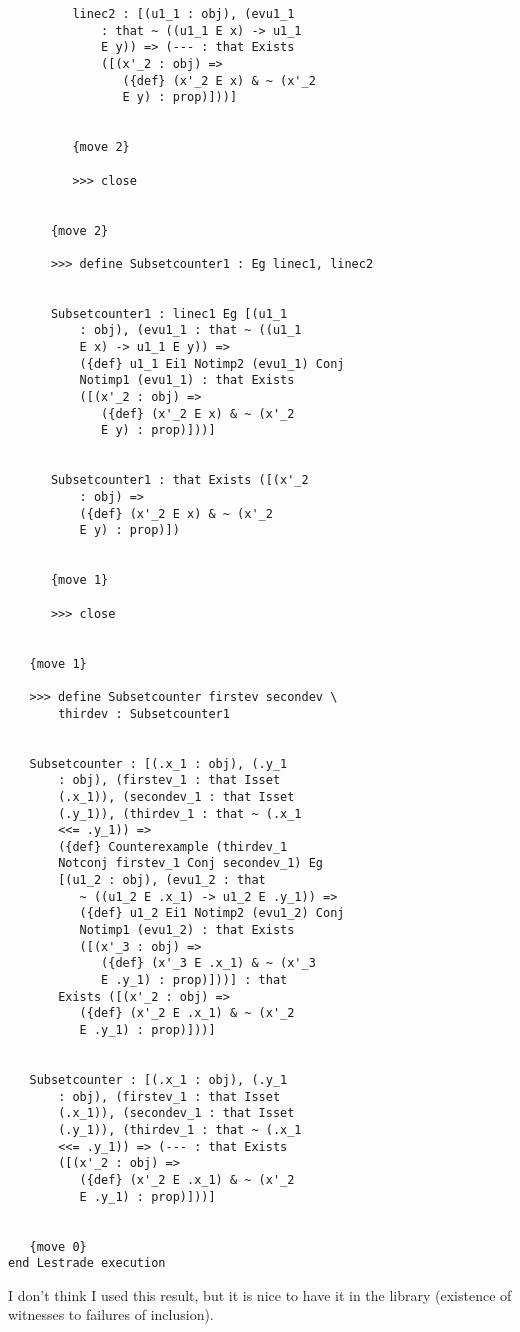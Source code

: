 \documentclass[12pt]{article}
\begin{document}
\begin{verbatim}
         linec2 : [(u1_1 : obj), (evu1_1 
             : that ~ ((u1_1 E x) -> u1_1 
             E y)) => (--- : that Exists 
             ([(x'_2 : obj) => 
                ({def} (x'_2 E x) & ~ (x'_2 
                E y) : prop)]))]


         {move 2}

         >>> close


      {move 2}

      >>> define Subsetcounter1 : Eg linec1, linec2


      Subsetcounter1 : linec1 Eg [(u1_1 
          : obj), (evu1_1 : that ~ ((u1_1 
          E x) -> u1_1 E y)) => 
          ({def} u1_1 Ei1 Notimp2 (evu1_1) Conj 
          Notimp1 (evu1_1) : that Exists 
          ([(x'_2 : obj) => 
             ({def} (x'_2 E x) & ~ (x'_2 
             E y) : prop)]))]


      Subsetcounter1 : that Exists ([(x'_2 
          : obj) => 
          ({def} (x'_2 E x) & ~ (x'_2 
          E y) : prop)])


      {move 1}

      >>> close


   {move 1}

   >>> define Subsetcounter firstev secondev \
       thirdev : Subsetcounter1


   Subsetcounter : [(.x_1 : obj), (.y_1 
       : obj), (firstev_1 : that Isset 
       (.x_1)), (secondev_1 : that Isset 
       (.y_1)), (thirdev_1 : that ~ (.x_1 
       <<= .y_1)) => 
       ({def} Counterexample (thirdev_1 
       Notconj firstev_1 Conj secondev_1) Eg 
       [(u1_2 : obj), (evu1_2 : that 
          ~ ((u1_2 E .x_1) -> u1_2 E .y_1)) => 
          ({def} u1_2 Ei1 Notimp2 (evu1_2) Conj 
          Notimp1 (evu1_2) : that Exists 
          ([(x'_3 : obj) => 
             ({def} (x'_3 E .x_1) & ~ (x'_3 
             E .y_1) : prop)]))] : that 
       Exists ([(x'_2 : obj) => 
          ({def} (x'_2 E .x_1) & ~ (x'_2 
          E .y_1) : prop)]))]


   Subsetcounter : [(.x_1 : obj), (.y_1 
       : obj), (firstev_1 : that Isset 
       (.x_1)), (secondev_1 : that Isset 
       (.y_1)), (thirdev_1 : that ~ (.x_1 
       <<= .y_1)) => (--- : that Exists 
       ([(x'_2 : obj) => 
          ({def} (x'_2 E .x_1) & ~ (x'_2 
          E .y_1) : prop)]))]


   {move 0}
end Lestrade execution
\end{verbatim}

I don't think I used this result, but it is nice to have it in the library (existence of witnesses to failures of inclusion).
\end{document}
